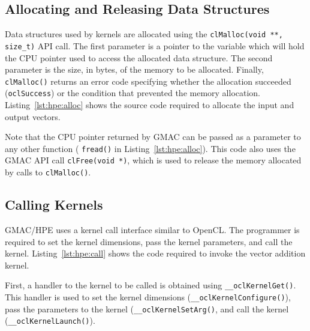 

\subsection{Allocating and Releasing Data Structures}
Data structures used by kernels are allocated using the \texttt{clMalloc(void **, size\_t)} API 
call. The first parameter is a pointer to the variable which will hold the CPU pointer used to 
access the allocated data structure. The second parameter is the size, in bytes, of the memory to be 
allocated. Finally, \texttt{clMalloc()} returns an error code specifying whether the allocation 
succeeded (\texttt{oclSuccess}) or the condition that prevented the memory allocation.  
Listing~\ref{lst:hpe:alloc} shows the source code required to allocate the input and output vectors.  



Note that the CPU pointer returned by GMAC can be passed as a parameter to any other function (\eg 
\texttt{fread()} in Listing~\ref{lst:hpe:alloc}). This code also uses the GMAC API call 
\texttt{clFree(void *)}, which is used to release the memory allocated by calls to 
\texttt{clMalloc()}.

\subsection{Calling Kernels}
GMAC\slash HPE uses a kernel call interface similar to OpenCL\@. The programmer is required to set 
the kernel dimensions, pass the kernel parameters, and call the kernel. Listing~\ref{lst:hpe:call} 
shows the code required to invoke the vector addition kernel.



First, a handler to the kernel to be called is obtained using \texttt{\_\_oclKernelGet()}. This 
handler is used to set the kernel dimensions (\texttt{\_\_oclKernelConfigure()}), pass the 
parameters to the kernel (\texttt{\_\_oclKernelSetArg()}, and call the kernel 
(\texttt{\_\_oclKernelLaunch()}).

